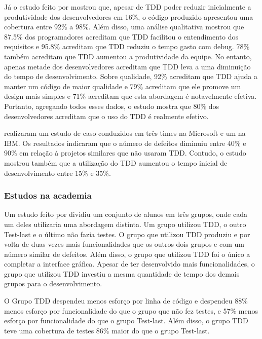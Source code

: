 Já o estudo feito por  mostrou que, apesar de TDD poder reduzir inicialmente a produtividade dos desenvolvedores em 16\%, o código produzido apresentou uma cobertura entre 92\% a 98\%. Além disso, uma análise qualitativa mostrou que 87.5\% dos programadores acreditam que TDD facilitou o entendimento dos requisitos e 95.8\% acreditam que TDD reduziu o tempo gasto com debug. 78\% também acreditam que TDD aumentou a produtividade da equipe. No entanto, apenas metade dos desenvolvedores acreditam que TDD leva a uma diminuição do tempo de desenvolvimento. Sobre qualidade, 92\% acreditam que TDD ajuda a manter um código de maior qualidade e 79\% acreditam que ele promove um design mais simples e 71\% acreditam que esta abordagem é notavelmente efetiva. Portanto, agregando todos esses dados, o estudo mostra que 80\% dos desenvolvedores acreditam que o uso do TDD é realmente efetivo.

 realizaram um estudo de caso conduzidos em três times na Microsoft e um na IBM. Os resultados indicaram que o número de defeitos diminuiu entre 40\% e 90\% em relação à projetos similares que não usaram TDD. Contudo, o estudo mostrou também que a utilização do TDD aumentou o tempo inicial de desenvolvimento entre 15\% e 35\%.


\subsubsection{Estudos na academia} %
\label{sub:estudos_na_academia}

Um estudo feito por  dividiu um conjunto de alunos em três grupos, onde cada um deles utilizaria uma abordagem distinta. Um grupo utilizou TDD, o outro Test-last e o último não fazia testes. O grupo que utilizou TDD produziu e por volta de duas vezes  mais funcionalidades que os outros dois grupos e com um número similar de defeitos. Além disso, o grupo que utilizou TDD foi o único a completar a interface gráfica. Apesar de ter desenvolvido mais funcionalidades, o grupo que utilizou TDD investiu a mesma quantidade de tempo dos demais grupos para o desenvolvimento.

O Grupo TDD despendeu menos esforço por linha de código e despendeu 88\% menos esforço por funcionalidade do que o grupo que não fez testes, e 57\% menos esforço por funcionalidade do que o grupo Test-last. Além disso, o grupo TDD teve uma cobertura de testes 86\% maior do que o grupo Test-last.

